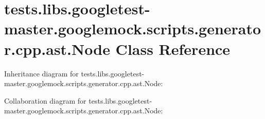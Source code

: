 \hypertarget{classtests_1_1libs_1_1googletest-master_1_1googlemock_1_1scripts_1_1generator_1_1cpp_1_1ast_1_1Node}{}\section{tests.\+libs.\+googletest-\/master.googlemock.\+scripts.\+generator.\+cpp.\+ast.\+Node Class Reference}
\label{classtests_1_1libs_1_1googletest-master_1_1googlemock_1_1scripts_1_1generator_1_1cpp_1_1ast_1_1Node}


Inheritance diagram for tests.\+libs.\+googletest-\/master.googlemock.\+scripts.\+generator.\+cpp.\+ast.\+Node\+:


Collaboration diagram for tests.\+libs.\+googletest-\/master.googlemock.\+scripts.\+generator.\+cpp.\+ast.\+Node\+:
